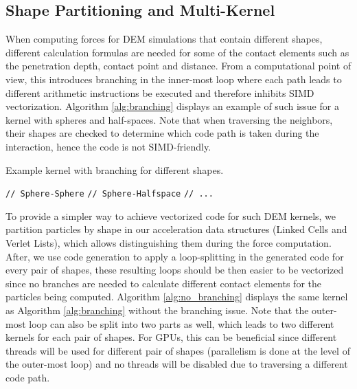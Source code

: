 \documentclass[Afour,sageh,times]{sagej}
\begin{document}
\subsection{Shape Partitioning and Multi-Kernel}
\label{sec:shape_partitioning}

When computing forces for DEM simulations that contain different shapes, different calculation formulas are needed for some of the contact elements such as the penetration depth, contact point and distance.
From a computational point of view, this introduces branching in the inner-most loop where each path leads to different arithmetic instructions be executed and therefore inhibits SIMD vectorization.
Algorithm \ref{alg:branching} displays an example of such issue for a kernel with spheres and half-spaces.
Note that when traversing the neighbors, their shapes are checked to determine which code path is taken during the interaction, hence the code is not SIMD-friendly.

\begin{algorithm}[H]
  \caption{Example kernel with branching for different shapes.}
  \label{alg:branching}
  \begin{algorithmic}[1]
          \State \texttt{// Sphere-Sphere}
        \EndIf
          \State \texttt{// Sphere-Halfspace}
        \EndIf
        \State \texttt{// ...}
      \EndFor
    \EndFor
  \end{algorithmic}
\end{algorithm}

To provide a simpler way to achieve vectorized code for such DEM kernels, we partition particles by shape in our acceleration data structures (Linked Cells and Verlet Lists), which allows distinguishing them during the force computation.
After, we use code generation to apply a loop-splitting in the generated code for every pair of shapes, these resulting loops should be then easier to be vectorized since no branches are needed to calculate different contact elements for the particles being computed.
Algorithm \ref{alg:no_branching} displays the same kernel as Algorithm \ref{alg:branching} without the branching issue.
Note that the outer-most loop can also be split into two parts as well, which leads to two different kernels for each pair of shapes.
For GPUs, this can be beneficial since different threads will be used for different pair of shapes (parallelism is done at the level of the outer-most loop) and no threads will be disabled due to traversing a different code path.
\end{document}
